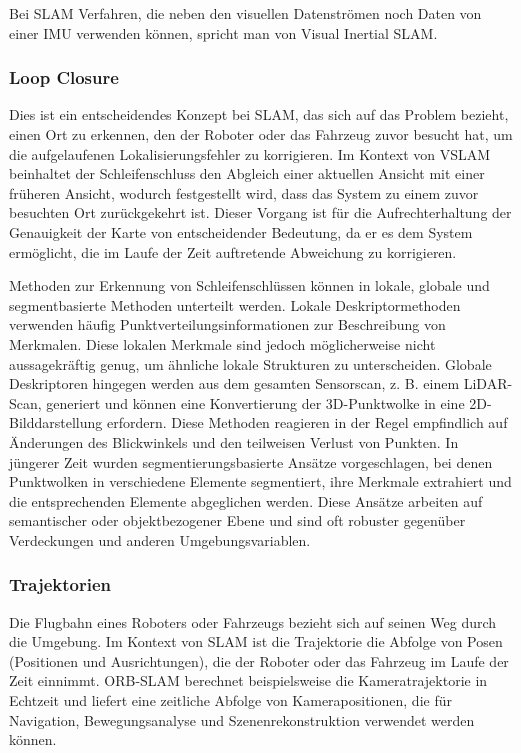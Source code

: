 Bei \ac{SLAM} Verfahren, die neben den visuellen Datenströmen noch Daten von einer \ac{IMU} verwenden können, spricht man von Visual Inertial \ac{SLAM}.

\subsubsection{Loop Closure}

Dies ist ein entscheidendes Konzept bei SLAM, das sich auf das Problem bezieht, einen Ort zu erkennen, den der Roboter oder das Fahrzeug zuvor besucht hat, um die aufgelaufenen Lokalisierungsfehler zu korrigieren. Im Kontext von \ac{VSLAM} beinhaltet der Schleifenschluss den Abgleich einer aktuellen Ansicht mit einer früheren Ansicht, wodurch festgestellt wird, dass das System zu einem zuvor besuchten Ort zurückgekehrt ist. Dieser Vorgang ist für die Aufrechterhaltung der Genauigkeit der Karte von entscheidender Bedeutung, da er es dem System ermöglicht, die im Laufe der Zeit auftretende Abweichung zu korrigieren.

Methoden zur Erkennung von Schleifenschlüssen können in lokale, globale und segmentbasierte Methoden unterteilt werden. Lokale Deskriptormethoden verwenden häufig Punktverteilungsinformationen zur Beschreibung von Merkmalen. Diese lokalen Merkmale sind jedoch möglicherweise nicht aussagekräftig genug, um ähnliche lokale Strukturen zu unterscheiden. Globale Deskriptoren hingegen werden aus dem gesamten Sensorscan, z. B. einem LiDAR-Scan, generiert und können eine Konvertierung der 3D-Punktwolke in eine 2D-Bilddarstellung erfordern. Diese Methoden reagieren in der Regel empfindlich auf Änderungen des Blickwinkels und den teilweisen Verlust von Punkten. In jüngerer Zeit wurden segmentierungsbasierte Ansätze vorgeschlagen, bei denen Punktwolken in verschiedene Elemente segmentiert, ihre Merkmale extrahiert und die entsprechenden Elemente abgeglichen werden. Diese Ansätze arbeiten auf semantischer oder objektbezogener Ebene und sind oft robuster gegenüber Verdeckungen und anderen Umgebungsvariablen.

\subsubsection{Trajektorien}

Die Flugbahn eines Roboters oder Fahrzeugs bezieht sich auf seinen Weg durch die Umgebung. Im Kontext von SLAM ist die Trajektorie die Abfolge von Posen (Positionen und Ausrichtungen), die der Roboter oder das Fahrzeug im Laufe der Zeit einnimmt. ORB-SLAM berechnet beispielsweise die Kameratrajektorie in Echtzeit und liefert eine zeitliche Abfolge von Kamerapositionen, die für Navigation, Bewegungsanalyse und Szenenrekonstruktion verwendet werden können.


